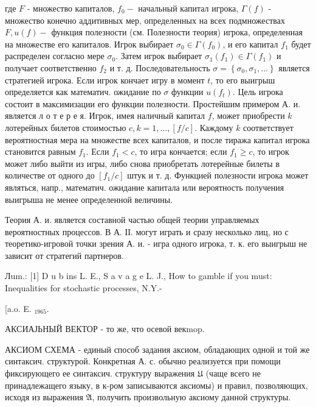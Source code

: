 \documentclass[10pt]{article}
\begin{document}
где $F$ - множество капиталов, $f_{0}-$ начальный капитал игрока, $\Gamma(f)$ - множество конечно аддитивных мер, определенных на всех подмножествах $F, u(f)-$ функция полезности (см. Полезности теория) игрока, определенная на множестве его капиталов. Игрок выбирает $\sigma_{0} \in \Gamma\left(f_{0}\right)$, и его капитал $f_{1}$ будет распределен согласно мере $\sigma_{0}$. Затем игрок выбирает $\sigma_{1}\left(f_{1}\right) \in \Gamma\left(f_{1}\right)$ и получает соответственно $f_{2}$ и т. д. Последовательность $\sigma=\left\{\sigma_{0}, \sigma_{1}, \ldots\right\}$ является стратегией игрока. Если игрок кончает игру в момент $t$, то его выигрыш определяется как математич. ожидание по $\sigma$ функции $u\left(f_{t}\right)$. Цель игрока состоит в максимизации его функции полезности. Простейшим примером А. и. является л о т е р е я. Игрок, имея наличный капитал $f$, может приобрести $k$ лотерейных билетов стоимостью $c, k=1, \ldots,[f / c]$. Каждому $k$ соответствует вероятностная мера на множестве всех капиталов, и после тиража капитал игрока становится равным $f_{1}$. Если $f_{1}<c$, то игра кончается; если $f_{1} \geqslant c$, то игрок может либо выйти из игры, либо снова приобретать лотерейные билеты в количестве от одного до $\left[f_{1} / c\right]$ штук и т. д. Функцией полезности игрока может являться, напр., математич. ожидание капитала или вероятность получения выигрыша не менее определенной величины.



Теория А. и. является составной частью общей теории управляемых вероятностных процессов. В А. ІІ. могут играть и сразу несколько лиц, но с теоретико-игровой точки зрения А. и. - игра одного игрока, т. к. его выигрыш не зависит от стратегий партнеров.



Лum.: [1] D u b ins L. E., S a v a g e L. J., How to gamble if you must: Inequalities for stochastic processes, N.Y.-

[a.o. E. $_{1965}$.



АКСИАЈЬНЫЙ ВЕКТОР - то же, что осевой векmop.



АКСИОМ СХЕМА - единый способ задания аксиом, обладающих одной и той же синтаксич. структурой. Конкретная А. с. обычно реализуется при помощи фиксирующего ее синтаксич. структуру выражения $\mathfrak{U}$ (чаще всего не принадлежащего языку, в к-ром записываются аксиомы) и правил, позволяющих, исходя из выражения $\mathfrak{A}$, получить произвольную аксиому данной структуры.
\end{document}
